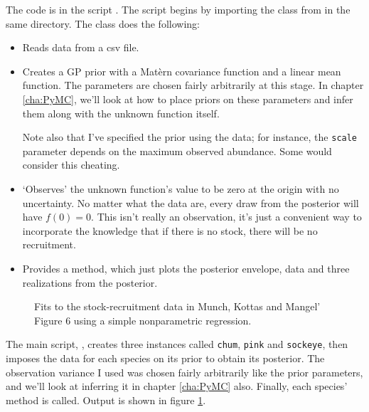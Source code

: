 The code is in the script . The script begins by importing the  class from  in the same directory.
The  class does the following:
\begin{itemize}
    \item Reads data from a csv file.
    \item Creates a GP prior with a Mat\`ern covariance function and a linear mean function. The parameters are chosen fairly arbitrarily at this stage. In chapter \ref{cha:PyMC}, we'll look at how to place priors on these parameters and infer them along with the unknown function itself.

    Note also that I've specified the prior using the data; for instance, the \texttt{scale} parameter depends on the maximum observed abundance. Some would consider this cheating.
    \item `Observes' the unknown function's value to be zero at the origin with no uncertainty. No matter what the data are, every draw from the posterior will have $f(0) = 0$. This isn't really an observation, it's just a convenient way to incorporate the knowledge that if there is no stock, there will be no recruitment.
    \item Provides a  method, which just plots the posterior envelope, data and three realizations from the posterior.
\end{itemize}
% 

\begin{figure}
    \centering
    \caption{Fits to the stock-recruitment data in Munch, Kottas and Mangel' \cite{mmk} Figure 6 using a simple nonparametric regression.}
    \label{fig:MMKregression}
\end{figure}

The main script, , creates three  instances called \texttt{chum}, \texttt{pink} and \texttt{sockeye}, then imposes the data for each species on its prior to obtain its posterior. The observation variance I used was chosen fairly arbitrarily like the prior parameters, and we'll look at inferring it in chapter \ref{cha:PyMC} also. Finally, each species'  method is called. Output is shown in figure \ref{fig:MMKregression}.
% 

